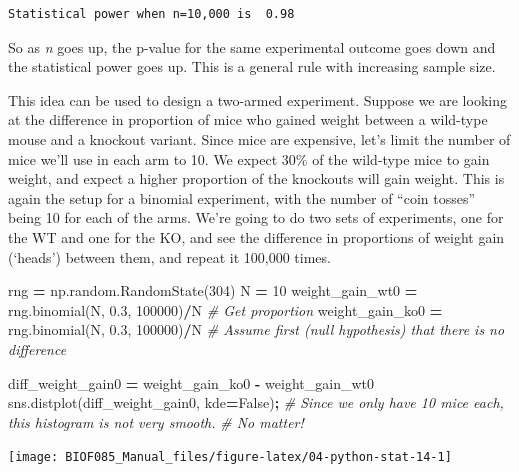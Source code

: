 \documentclass[
  letterpaper,
]{scrbook}
\newenvironment{Shaded}{\begin{snugshade}}{\end{snugshade}}
\newcommand{\CommentTok}[1]{\textcolor[rgb]{0.56,0.35,0.01}{\textit{#1}}}
\newcommand{\DecValTok}[1]{\textcolor[rgb]{0.00,0.00,0.81}{#1}}
\newcommand{\FloatTok}[1]{\textcolor[rgb]{0.00,0.00,0.81}{#1}}
\newcommand{\NormalTok}[1]{#1}
\newcommand{\OperatorTok}[1]{\textcolor[rgb]{0.81,0.36,0.00}{\textbf{#1}}}
\newcommand{\VariableTok}[1]{\textcolor[rgb]{0.00,0.00,0.00}{#1}}
\begin{document}
\begin{verbatim}
Statistical power when n=10,000 is  0.98
\end{verbatim}

So as \emph{n} goes up, the p-value for the same experimental outcome goes down and the statistical power goes up. This is a general rule with increasing sample size.

This idea can be used to design a two-armed experiment. Suppose we are looking at the difference in proportion of mice who gained weight between a wild-type mouse and a knockout variant. Since mice are expensive, let's limit the number of mice we'll use in each arm to 10. We expect 30\% of the wild-type mice to gain weight, and expect a higher proportion of the knockouts will gain weight. This is again the setup for a binomial experiment, with the number of ``coin tosses'' being 10 for each of the arms. We're going to do two sets of experiments, one for the WT and one for the KO, and see the difference in proportions of weight gain (`heads') between them, and repeat it 100,000 times.

\begin{Shaded}
\begin{Highlighting}[]
\NormalTok{rng }\OperatorTok{=}\NormalTok{ np.random.RandomState(}\DecValTok{304}\NormalTok{)}
\NormalTok{N }\OperatorTok{=} \DecValTok{10}
\NormalTok{weight_gain_wt0 }\OperatorTok{=}\NormalTok{ rng.binomial(N, }\FloatTok{0.3}\NormalTok{, }\DecValTok{100000}\NormalTok{)}\OperatorTok{/}\NormalTok{N }\CommentTok{# Get proportion}
\NormalTok{weight_gain_ko0 }\OperatorTok{=}\NormalTok{ rng.binomial(N, }\FloatTok{0.3}\NormalTok{, }\DecValTok{100000}\NormalTok{)}\OperatorTok{/}\NormalTok{N }\CommentTok{# Assume first (null hypothesis) that there is no difference}

\NormalTok{diff_weight_gain0 }\OperatorTok{=}\NormalTok{ weight_gain_ko0 }\OperatorTok{-}\NormalTok{ weight_gain_wt0}
\NormalTok{sns.distplot(diff_weight_gain0, kde}\OperatorTok{=}\VariableTok{False}\NormalTok{)}\OperatorTok{;} \CommentTok{# Since we only have 10 mice each, this histogram is not very smooth. }
                                           \CommentTok{# No matter!}
\end{Highlighting}
\end{Shaded}

\begin{center}\texttt{[image: BIOF085\_Manual\_files/figure-latex/04-python-stat-14-1]} \end{center}
\end{document}
